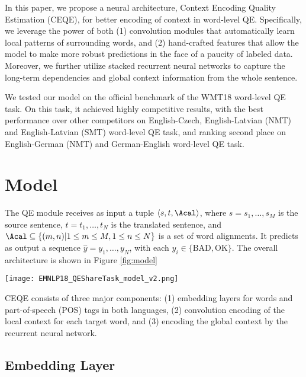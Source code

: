 \documentclass[11pt,a4paper]{article}
\begin{document}
In this paper, we propose a neural architecture, Context Encoding Quality Estimation (CEQE), for better encoding of context in word-level QE.
Specifically, we leverage the power of both (1) convolution modules that automatically learn local patterns of surrounding words, and (2) hand-crafted features that allow the model to make more robust predictions in the face of a paucity of labeled data.
Moreover, we further utilize stacked recurrent neural networks to capture the long-term dependencies and global context information from the whole sentence.

We tested our model on the official benchmark of the WMT18 word-level QE task.
On this task, it achieved highly competitive results, with the best performance over other competitors
on English-Czech, English-Latvian (NMT) and English-Latvian (SMT) word-level QE task, and ranking second place on English-German (NMT) and German-English word-level QE task.

\section{Model}

The QE module receives as input a tuple $\langle s, t, \Acal \rangle$,
where $s = s_1, \ldots, s_M$ is the source sentence,
$t = t_1, \ldots, t_N$ is the translated sentence,
and $\Acal \subseteq \{ (m, n) | 1 \leq m \leq M, 1 \leq n \leq N \}$
is a set of word alignments.
It predicts as output a sequence $\hat{y} = y_1, \ldots, y_N$,
with each $y_i \in \{\text{BAD}, \text{OK}\}$.
The overall architecture is shown in Figure \ref{fig:model}
\begin{figure*}
	\centering
    \texttt{[image: EMNLP18\_QEShareTask\_model\_v2.png]}
    	\caption{The architecture of our model, with the convolutional encoder on the left, and stacked RNN on the right.}
	\label{fig:model}
\end{figure*}

CEQE consists of three major components: (1) embedding layers for words and part-of-speech (POS) tags in both languages, (2) convolution encoding of the local context for each target word, and (3) encoding the global context by the recurrent neural network.    

\subsection{Embedding Layer}
\end{document}
